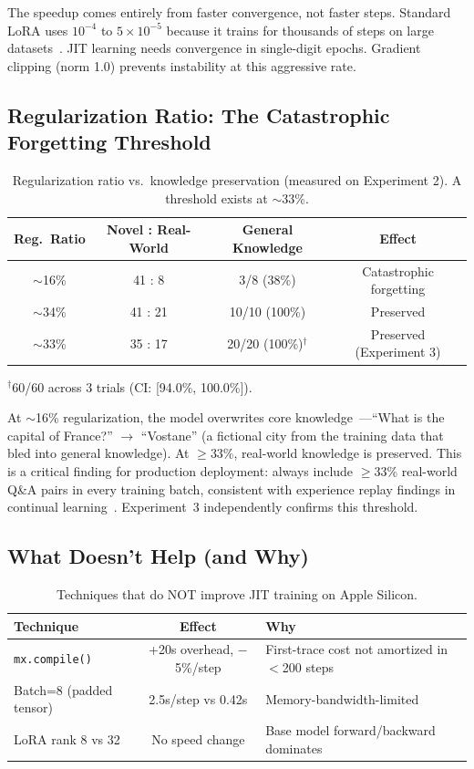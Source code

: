 \documentclass[11pt,a4paper]{article}
\begin{document}
The speedup comes entirely from faster convergence, not faster steps. Standard LoRA uses $10^{-4}$ to $5 \times 10^{-5}$ because it trains for thousands of steps on large datasets~\cite{hu2021lora}. JIT learning needs convergence in single-digit epochs. Gradient clipping (norm 1.0) prevents instability at this aggressive rate.

\subsection{Regularization Ratio: The Catastrophic Forgetting Threshold}
\label{sec:ablation-reg}

\begin{table}[H]
\centering
\caption{Regularization ratio vs.\ knowledge preservation (measured on Experiment 2). A threshold exists at $\sim$33\%.}
\label{tab:reg}
\begin{tabular}{cccc}
\toprule
\textbf{Reg.\ Ratio} & \textbf{Novel : Real-World} & \textbf{General Knowledge} & \textbf{Effect} \\
\midrule
$\sim$16\% & 41 : 8 & 3/8 (38\%) & Catastrophic forgetting \\
$\sim$34\% & 41 : 21 & 10/10 (100\%) & Preserved \\
$\sim$33\% & 35 : 17 & 20/20 (100\%)$^\dagger$ & Preserved (Experiment 3) \\
\bottomrule
\end{tabular}
\end{table}
{\small $^\dagger$60/60 across 3 trials (CI: [94.0\%, 100.0\%]).}

At $\sim$16\% regularization, the model overwrites core knowledge~\cite{mccloskey1989catastrophic}---``What is the capital of France?'' $\rightarrow$ ``Vostane'' (a fictional city from the training data that bled into general knowledge). At $\geq$33\%, real-world knowledge is preserved. This is a critical finding for production deployment: always include $\geq$33\% real-world Q\&A pairs in every training batch, consistent with experience replay findings in continual learning~\cite{rolnick2019experience}. Experiment~3 independently confirms this threshold.

\subsection{What Doesn't Help (and Why)}

\begin{table}[H]
\centering
\caption{Techniques that do NOT improve JIT training on Apple Silicon.}
\label{tab:nospeedup}
\begin{tabular}{lcl}
\toprule
\textbf{Technique} & \textbf{Effect} & \textbf{Why} \\
\midrule
\texttt{mx.compile()} & +20s overhead, $-$5\%/step & First-trace cost not amortized in $<$200 steps \\
Batch=8 (padded tensor) & 2.5s/step vs 0.42s & Memory-bandwidth-limited \\
LoRA rank 8 vs 32 & No speed change & Base model forward/backward dominates \\
\bottomrule
\end{tabular}
\end{table}
\end{document}
